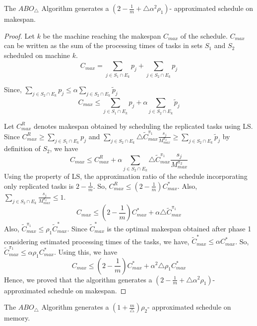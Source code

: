 \documentclass[twocolumn]{svjour3}
\begin{document}
\begin{theorem}
  \label{th:chapter5-la}
  The $ABO_\triangle$ Algorithm generates a $
  (2-\frac{1}{m}+\triangle\alpha^2 \rho_1) $- approximated schedule on
  makespan.
\end{theorem}         
\begin{proof}
  Let $k$ be the machine reaching the makespan $C_{max}$ of the
  schedule. $C_{max}$ can be written as the sum of the processing
  times of tasks in sets $S_1$ and $S_2$ scheduled on machine $k$.
  \begin{equation}\nonumber
    C_{max}= \sum_{j \in S_1 \cap E_k}^{}p_j+\sum_{j \in S_2 \cap E_k}^{}p_j 
  \end{equation}
  
  Since, $\sum\limits_{j \in S_2 \cap
    E_k}^{}p_j\leq\alpha \sum \limits_{j \in S_2 \cap E_k} \tilde{p}_j$
  \begin{equation}\nonumber
    C_{max} \leq \sum_{j \in S_1 \cap E_k}^{}p_j+\alpha\sum_{j \in S_2 \cap E_k} \tilde{p}_j 
  \end{equation}
          
           
  Let $C^R_{max}$ denotes makespan obtained by scheduling the
  replicated tasks using LS. Since $C^R_{max} \geq \sum\limits_{j \in
    S_1 \cap E_k}^{}p_j$ and $\sum\limits_{j \in S_2\cap E_k}\triangle
  {\tilde{C}^{\pi_1}_{max}} \frac{s_j}{M^{\pi_2}_{max}}\geq
  \sum\limits _{j \in S_2\cap E_k}^{}\tilde{p}_j $ by definition of
  $S_2$, we have
  \begin{equation}\nonumber
    C_{max}\leq C^R_{max}+\alpha\sum_{j \in S_2\cap E_k}^{}\triangle {\tilde{C}^{\pi_1}_{max}} \frac{s_j}{M^{\pi_2}_{max}}
  \end{equation}
  Using the property of LS, the approximation ratio of the schedule
  incorporating only replicated tasks is $2-\frac{1}{m}$. So,
  $C^R_{max} \leq (2-\frac{1}{m})C^{*}_{max}$. Also, $\sum\limits
  _{j\in S_2\cap E_k}^{} \frac{s_j}{M^{\pi_2}_{max}}\leq 1$.
  \begin{equation}\nonumber
    C_{max}\leq (2-\frac{1}{m})C^{*}_{max}+\alpha\triangle {\tilde{C}^{\pi_1}_{max}} 
  \end{equation}
  Also, ${\tilde{C}^{\pi_1}_{max}} \leq \rho_1
  {\tilde{C}^{*}_{max}}$. Since $\tilde{C}^{*}_{max}$ is the optimal
  makespan obtained after phase 1 considering estimated processing
  times of the tasks, we have, $\tilde{C}^{*}_{max}\leq
  \alpha{C}^{*}_{max}$. So, ${\tilde{C}^{\pi_1}_{max}} \leq \alpha
  \rho_1{C}^{*}_{max}$. Using this, we have
  \begin{equation}\nonumber
    C_{max}\leq (2-\frac{1}{m}){{C}^{*}_{max}}+\alpha^2\triangle \rho_1 {{C}^{*}_{max}} 
  \end{equation}
  Hence, we proved that the algorithm generates a
  $(2-\frac{1}{m}+\triangle \alpha^2\rho_1) $- approximated schedule
  on makespan.
\end{proof}
\begin{theorem}
  \label{th:chapter5-lb}
  The $ABO_\triangle$ Algorithm generates a $
  (1+\frac{m}{\triangle})\rho_2 $- approximated schedule on memory.
\end{theorem}
        
\end{document}
